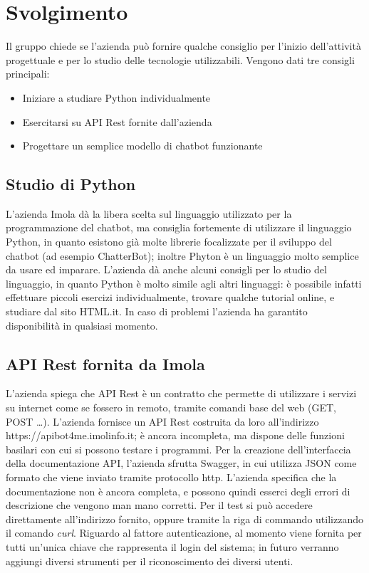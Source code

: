 \section{Svolgimento}
Il gruppo chiede se l’azienda può fornire qualche consiglio per l’inizio dell’attività progettuale e per lo studio delle tecnologie utilizzabili.
Vengono dati tre consigli principali:
	\begin{itemize}
		\item Iniziare a studiare Python individualmente
		\item Esercitarsi su API Rest fornite dall’azienda
		\item Progettare un semplice modello di chatbot funzionante
	\end{itemize}

\subsection{Studio di Python}
L’azienda Imola dà la libera scelta sul linguaggio utilizzato per la programmazione del chatbot, ma consiglia fortemente di utilizzare il linguaggio Python, in quanto esistono già molte librerie focalizzate per il sviluppo del chatbot (ad esempio ChatterBot); inoltre Phyton è un linguaggio molto semplice da usare ed imparare.
L'azienda dà anche alcuni consigli per lo studio del linguaggio, in quanto Python è molto simile agli altri linguaggi: è possibile infatti effettuare piccoli esercizi individualmente, trovare qualche tutorial online, e studiare dal sito HTML.it. In caso di problemi l'azienda ha garantito disponibilità in qualsiasi momento. 

\subsection{API Rest fornita da Imola}
L’azienda spiega che API Rest è un contratto che permette di utilizzare i servizi su internet come se fossero in remoto, tramite comandi base del web (GET, POST …).\newline
L’azienda fornisce un API Rest costruita da loro all'indirizzo https://apibot4me.imolinfo.it; è ancora incompleta, ma dispone delle funzioni basilari con cui si possono testare i programmi.\newline
Per la creazione dell’interfaccia della documentazione API, l’azienda sfrutta Swagger, in cui utilizza JSON come formato che viene inviato tramite protocollo http. \newline
L’azienda specifica che la documentazione non è ancora completa, e possono quindi esserci degli errori di descrizione che vengono man mano corretti.\newline
Per il test si può accedere direttamente all'indirizzo fornito, oppure tramite la riga di commando utilizzando il comando \textit{curl}. \newline
Riguardo al fattore autenticazione, al momento viene fornita per tutti un'unica chiave che rappresenta il login del sistema; in futuro verranno aggiungi diversi strumenti per il riconoscimento dei diversi utenti.

